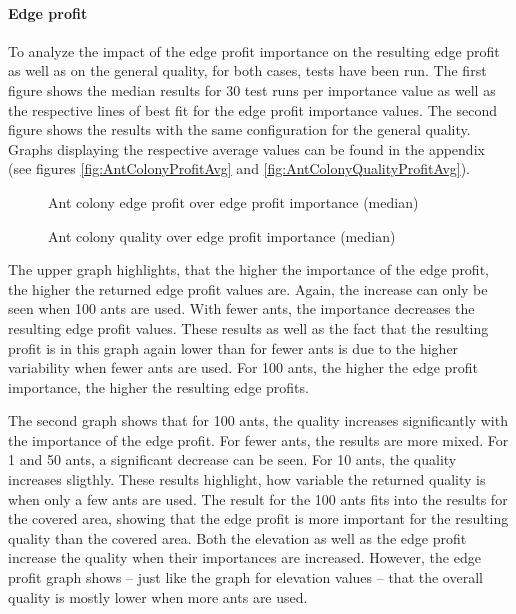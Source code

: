 \paragraph{Edge profit}

To analyze the impact of the edge profit importance on the resulting edge profit as well as on the general quality, for both cases, tests have been run.
The first figure shows the median results for 30 test runs per importance value as well as the respective lines of best fit for the edge profit importance values.
The second figure shows the results with the same configuration for the general quality.
Graphs displaying the respective average values can be found in the appendix (see figures \ref{fig:AntColonyProfitAvg} and \ref{fig:AntColonyQualityProfitAvg}).


\begin{figure}[H]
	\centering
	
	\caption{Ant colony edge profit over edge profit importance (median)}
	\label{fig:AntColonyProfitMed}
\end{figure}


\begin{figure}[H]
	\centering
	
	\caption{Ant colony quality over edge profit importance (median)}
	\label{fig:AntColonyQualityProfitMed}
\end{figure}


The upper graph highlights, that the higher the importance of the edge profit, the higher the returned edge profit values are. 
Again, the increase can only be seen when 100 ants are used. 
With fewer ants, the importance decreases the resulting edge profit values.
These results as well as the fact that the resulting profit is in this graph again lower than for fewer ants is due to the higher variability when fewer ants are used.
For 100 ants, the higher the edge profit importance, the higher the resulting edge profits.


The second graph shows that for 100 ants, the quality increases significantly with the importance of the edge profit.
For fewer ants, the results are more mixed.
For 1 and 50 ants, a significant decrease can be seen.
For 10 ants, the quality increases sligthly.
These results highlight, how variable the returned quality is when only a few ants are used.
The result for the 100 ants fits into the results for the covered area, showing that the edge profit is more important for the resulting quality than the covered area. 
Both the elevation as well as the edge profit increase the quality when their importances are increased.
However, the edge profit graph shows -- just like the graph for elevation values -- that the overall quality is mostly lower when more ants are used.


